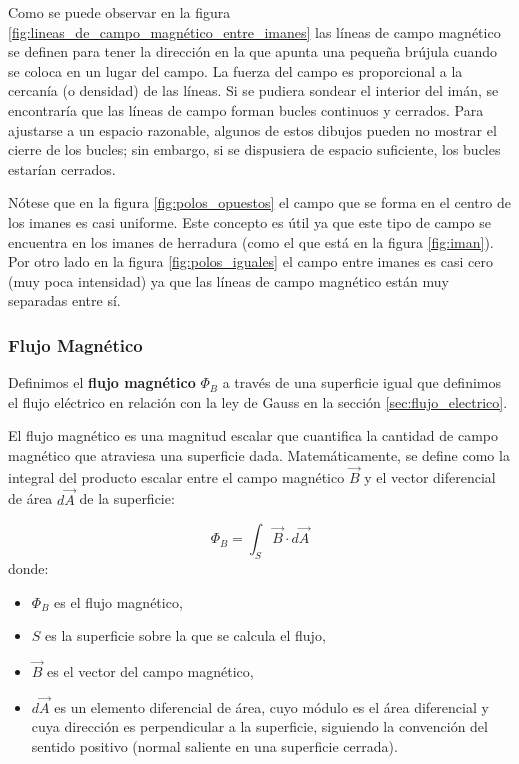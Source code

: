 Como se puede observar en la figura \ref{fig:lineas_de_campo_magnético_entre_imanes} las líneas de campo magnético se definen para tener la dirección en la que apunta una pequeña brújula cuando se coloca en un lugar del campo. La fuerza del campo es proporcional a la cercanía (o densidad) de las líneas. Si se pudiera sondear el interior del imán, se encontraría que las líneas de campo forman bucles continuos y cerrados. Para ajustarse a un espacio razonable, algunos de estos dibujos pueden no mostrar el cierre de los bucles; sin embargo, si se dispusiera de espacio suficiente, los bucles estarían cerrados. 

Nótese que en la figura \ref{fig:polos_opuestos} el campo que se forma en el centro de los imanes es casi uniforme. Este concepto es útil ya que este tipo de campo se encuentra en los imanes de herradura (como el que está en la figura \ref{fig:iman}). Por otro lado en la figura \ref{fig:polos_iguales} el campo entre imanes es casi cero (muy poca intensidad) ya que las líneas de campo magnético están muy separadas entre sí.

\subsubsection{Flujo Magnético}

Definimos el \textbf{flujo magnético} \(\Phi_B\) a través de una superficie igual que definimos el flujo eléctrico en relación con la ley de Gauss en la sección \ref{sec:flujo_electrico}. 

El flujo magnético es una magnitud escalar que cuantifica la cantidad de campo magnético que atraviesa una superficie dada. Matemáticamente, se define como la integral del producto escalar entre el campo magnético \(\vec{B}\) y el vector diferencial de área \(d\vec{A}\) de la superficie:

\[
\Phi_B = \int_S \vec{B} \cdot d\vec{A}
\]
donde:
\begin{itemize}
  \item \(\Phi_B\) es el flujo magnético,
  \item \(S\) es la superficie sobre la que se calcula el flujo,
  \item \(\vec{B}\) es el vector del campo magnético,
  \item \(d\vec{A}\) es un elemento diferencial de área, cuyo módulo es el área diferencial y cuya dirección es perpendicular a la superficie, siguiendo la convención del sentido positivo (normal saliente en una superficie cerrada).
\end{itemize}

